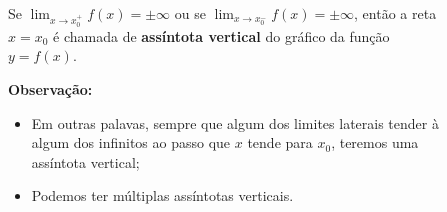 \begin{frame}
  \begin{columns}[onlytextwidth]
    \begin{column}{0.55\textwidth}\vspace{-0.5cm}
      \begin{definition}
        Se $\displaystyle\lim_{x\rightarrow x_{0}^{+}}f(x)=\pm\infty$ ou se $\displaystyle\lim_{x\rightarrow x_{0}^{-}}f(x)=\pm\infty$, então a reta $x=x_{0}$ é chamada de \textbf{assíntota vertical} do gráfico da função $y=f(x)$.
      \end{definition}
      \begin{highlight}
        \textbf{Observação:}
        \begin{itemize}
          \item Em outras palavas, sempre que algum dos limites laterais tender à algum dos infinitos ao passo que $x$ tende para $x_{0}$, teremos uma assíntota vertical;
          \item Podemos ter múltiplas assíntotas verticais.
        \end{itemize}
      \end{highlight}
    \end{column}
    \begin{column}{0.45\textwidth}\vspace{-0.5cm}
      \begin{figure}
      \end{figure}
    \end{column}
  \end{columns}
\end{frame}


